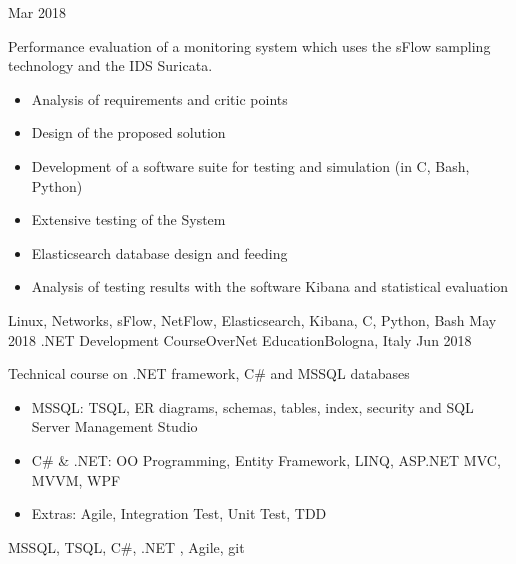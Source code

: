 \begin{experiences}
    {Mar 2018} {
                      Performance evaluation of a monitoring system which uses the sFlow sampling technology  and the IDS Suricata.
                      \begin{itemize}
                        \item Analysis of requirements and critic points
                        \item Design of the proposed solution
                        \item Development of a software suite for testing and simulation (in C, Bash, Python)
                        \item Extensive testing of the System
                        \item Elasticsearch database design and feeding
                        \item Analysis of testing results with the software Kibana and statistical evaluation
                      \end{itemize}
                    }
                    {Linux, Networks, sFlow, NetFlow, Elasticsearch, Kibana, C, Python, Bash}
  \emptySeparator
  \experience
  {May 2018}   {.NET Development Course}{OverNet Education}{Bologna, Italy}
  {Jun 2018} {
                    Technical course on .NET framework, C\# and MSSQL databases
                    \begin{itemize}
                    \item MSSQL: TSQL, ER diagrams, schemas, tables, index, security and SQL Server Management Studio
                    \item C\# \& .NET: OO Programming, Entity Framework, LINQ, ASP.NET MVC, MVVM, WPF
                    \item Extras: Agile, Integration Test, Unit Test, TDD 
                    \end{itemize}
                  }
                  {MSSQL, TSQL, C\#, .NET , Agile, git}
\emptySeparator
\end{experiences}
